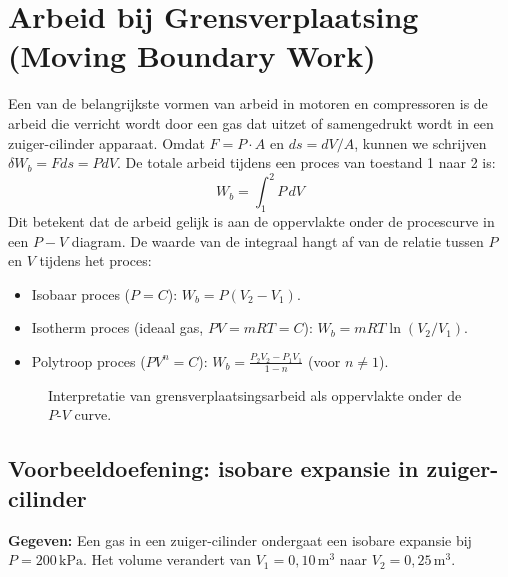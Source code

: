 \documentclass[a4paper,11pt,twoside]{report}
\begin{document}
\section{Arbeid bij Grensverplaatsing (Moving Boundary Work)}
Een van de belangrijkste vormen van arbeid in motoren en compressoren is de arbeid die verricht wordt door een gas dat uitzet of samengedrukt wordt in een zuiger-cilinder apparaat.
  Omdat $F = P \cdot A$ en $ds = dV / A$,
   kunnen we schrijven $\delta W_b = F ds = P dV$.
De totale arbeid tijdens een proces van toestand 1 naar 2 is:
\[
W_b = \int_{1}^{2} P \, dV
\]
Dit betekent dat de arbeid gelijk is aan de oppervlakte onder de procescurve in een $P-V$ diagram. De waarde van de integraal hangt af van de relatie tussen $P$ en $V$ tijdens het proces:
\begin{itemize}
    \item Isobaar proces ($P = C$): $W_b = P(V_2 - V_1)$.
    \item Isotherm proces (ideaal gas, $PV = mRT = C$): $W_b = mRT \ln(V_2/V_1)$.
    \item Polytroop proces ($PV^n = C$): $W_b = \frac{P_2V_2 - P_1V_1}{1-n}$ (voor $n \neq 1$).
\end{itemize}

\begin{figure}[H]
    \centering
    \caption{Interpretatie van grensverplaatsingsarbeid als oppervlakte onder de $P$-$V$ curve.}
\end{figure}

\subsection*{Voorbeeldoefening: isobare expansie in zuiger-cilinder}
        	\textbf{Gegeven:} Een gas in een zuiger-cilinder ondergaat een isobare expansie bij $P=200\,\mathrm{kPa}$. Het volume verandert van $V_1=0{,}10\,\mathrm{m^3}$ naar $V_2=0{,}25\,\mathrm{m^3}$.
\end{document}
